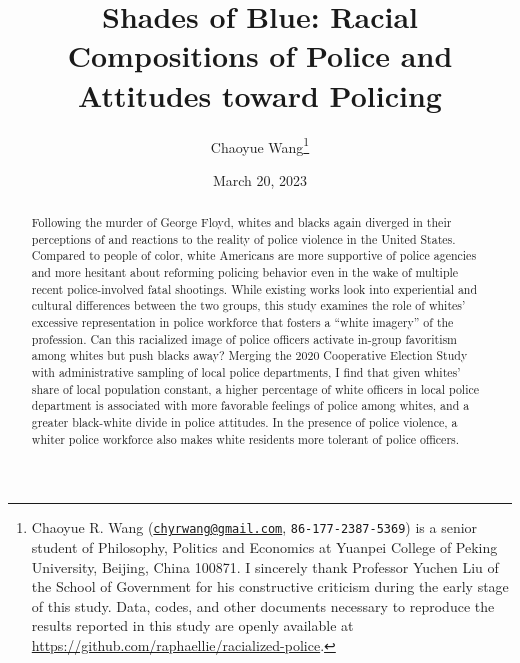 \documentclass[
  12pt,
]{article}
\title{\textbf{Shades of Blue: Racial Compositions of Police and
Attitudes toward Policing}}
\author{Chaoyue Wang\footnote{Chaoyue R. Wang
  (\href{mailto:chyrwang@gmail.com}{\nolinkurl{chyrwang@gmail.com}},
  \texttt{86-177-2387-5369}) is a senior student of Philosophy, Politics
  and Economics at Yuanpei College of Peking University, Beijing, China
  100871. I sincerely thank Professor Yuchen Liu of the School of
  Government for his constructive criticism during the early stage of
  this study. Data, codes, and other documents necessary to reproduce
  the results reported in this study are openly available at
  \url{https://github.com/raphaellie/racialized-police}.}}
\date{March 20, 2023}
\begin{document}

\maketitle


\thispagestyle{empty}

\begin{abstract} 
\noindent %
Following the murder of George Floyd, whites and blacks again diverged
in their perceptions of and reactions to the reality of police violence
in the United States. Compared to people of color, white Americans are
more supportive of police agencies and more hesitant about reforming
policing behavior even in the wake of multiple recent police-involved
fatal shootings. While existing works look into experiential and
cultural differences between the two groups, this study examines the
role of whites' excessive representation in police workforce that
fosters a ``white imagery'' of the profession. Can this racialized image
of police officers activate in-group favoritism among whites but push
blacks away? Merging the 2020 Cooperative Election Study with
administrative sampling of local police departments, I find that given
whites' share of local population constant, a higher percentage of white
officers in local police department is associated with more favorable
feelings of police among whites, and a greater black-white divide in
police attitudes. In the presence of police violence, a whiter police
workforce also makes white residents more tolerant of police officers.
\end{abstract}

\begin{quote}
\end{quote}

\newpage \clearpage {}\captionsetup{labelfont = bf, font = small}




\ifdefined\Shaded\renewenvironment{Shaded}{\begin{tcolorbox}[frame hidden, borderline west={3pt}{0pt}{shadecolor}, interior hidden, enhanced, sharp corners, boxrule=0pt, breakable]}{\end{tcolorbox}}\fi
\end{document}
